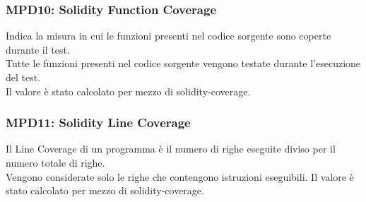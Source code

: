 \subsubsection{MPD10: Solidity Function Coverage}\label{sssec:solidity_function_coverage}
Indica la misura in cui le funzioni presenti nel codice sorgente sono coperte durante il test.\\
Tutte le funzioni presenti nel codice sorgente vengono testate durante l'esecuzione del test.\\
Il valore è stato calcolato per mezzo di solidity-coverage.

\subsubsection{MPD11: Solidity Line Coverage}\label{sssec:solidity_line_coverage}
Il Line Coverage di un programma è il numero di righe eseguite diviso per il numero totale di righe.\\
Vengono considerate solo le righe che contengono istruzioni eseguibili.
Il valore è stato calcolato per mezzo di solidity-coverage.
